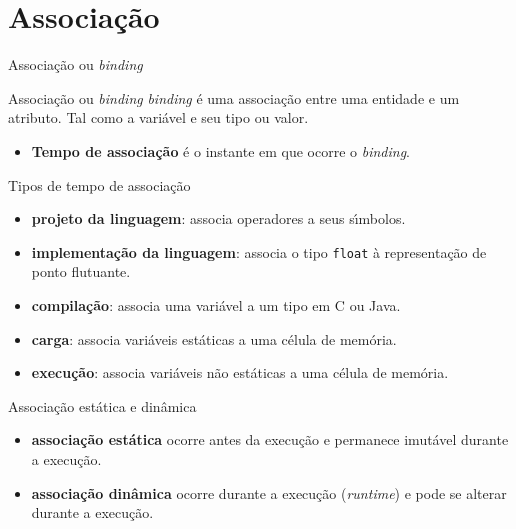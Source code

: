 \documentclass[handout,aspectratio=169]{beamer}
\begin{document}
\section{Associa\c{c}\~{a}o}

\begin{frame}{Associa\c{c}\~{a}o ou \textit{binding}}

\begin{block}{Associa\c{c}\~{a}o ou \textit{binding}}
\textit{binding} \'{e} uma associa\c{c}\~{a}o entre uma entidade e um atributo. Tal como a vari\'{a}vel e seu tipo ou valor.
\end{block}

\begin{itemize}
\item \textbf{Tempo de associa\c{c}\~{a}o} \'{e} o instante em que ocorre o \textit{binding}.
\end{itemize}

\end{frame}


\begin{frame}{Tipos de tempo de associa\c{c}\~{a}o}

\begin{itemize}
\item \textbf{projeto da linguagem}: associa operadores a seus s\'{\i}mbolos.
\item \textbf{implementa\c{c}\~{a}o da linguagem}: associa o tipo \lstinline|float| à representa\c{c}\~{a}o de ponto flutuante.
\item \textbf{compila\c{c}\~{a}o}: associa uma vari\'{a}vel a um tipo em C ou Java.
\item \textbf{carga}: associa vari\'{a}veis est\'{a}ticas a uma c\'{e}lula de mem\'{o}ria.
\item \textbf{execu\c{c}\~{a}o}: associa vari\'{a}veis n\~{a}o est\'{a}ticas a uma c\'{e}lula de mem\'{o}ria.
\end{itemize}

\end{frame}

\begin{frame}{Associa\c{c}\~{a}o est\'{a}tica e din\^{a}mica}

\begin{itemize}
\item \textbf{associa\c{c}\~{a}o est\'{a}tica} ocorre antes da execu\c{c}\~{a}o e permanece imut\'{a}vel durante a execu\c{c}\~{a}o.
\item \textbf{associa\c{c}\~{a}o din\^{a}mica} ocorre durante a execu\c{c}\~{a}o (\textit{runtime}) e pode se alterar durante a execu\c{c}\~{a}o.
\end{itemize}
\end{frame}
\end{document}
